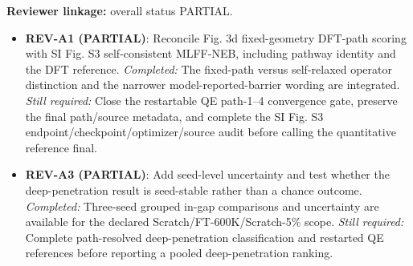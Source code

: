 \textbf{Reviewer linkage:} overall status PARTIAL.
\begin{itemize}[leftmargin=1.4em,noitemsep]
\item \textbf{REV-A1 (PARTIAL)}: Reconcile Fig. 3d fixed-geometry DFT-path scoring with SI Fig. S3 self-consistent MLFF-NEB, including pathway identity and the DFT reference. \emph{Completed:} The fixed-path versus self-relaxed operator distinction and the narrower model-reported-barrier wording are integrated. \emph{Still required:} Close the restartable QE path-1--4 convergence gate, preserve the final path/source metadata, and complete the SI Fig. S3 endpoint/checkpoint/optimizer/source audit before calling the quantitative reference final.
\item \textbf{REV-A3 (PARTIAL)}: Add seed-level uncertainty and test whether the deep-penetration result is seed-stable rather than a chance outcome. \emph{Completed:} Three-seed grouped in-gap comparisons and uncertainty are available for the declared Scratch/FT-600K/Scratch-5\% scope. \emph{Still required:} Complete path-resolved deep-penetration classification and restarted QE references before reporting a pooled deep-penetration ranking.
\end{itemize}
